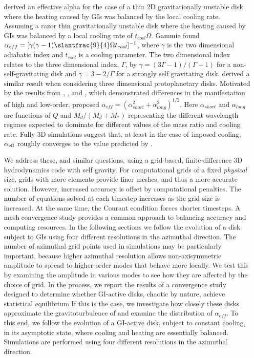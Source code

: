 \documentclass[manuscript]{aastex}
\begin{document}
\citet{gammie2001} derived an effective alpha for the case of a thin 2D gravitationally unstable disk where the heating caused by GIs was balanced by the local cooling rate.  
Assuming a razor thin gravitationally unstable disk where the heating caused by
GIs was balanced by a local cooling rate of $t_{cool}\Omega$.
Gammie found
$\alpha_{eff} = [\gamma(\gamma - 1) \slantfrac{9}{4}\Omega t_{cool}]^{-1}$,
where $\gamma$ is the two dimensional adiabatic index and $t_{cool}$ is a cooling parameter. 
The two dimensional index relates
to the three dimensional index, $\Gamma$, by 
$\gamma = (3\Gamma - 1) / (\Gamma + 1)$
for a non-self-gravitating
disk and
$\gamma = 3 - 2/\Gamma $
for a strongly self gravitating disk.   \cite{lodato2004} derived a similar result when considering three dimensional protoplanetary disks.
Motivated by
the results from \cite{laughlin1996}, \cite{gammie2001}, and \cite{lodato2004, lodato2005}, which demonstrated differences in the manifestation of high and low-order, \citet{kratter2008} 
proposed $\alpha_{eff} = (\alpha_{short}^2 + \alpha_{long}^2)^{1/2}$. Here $\alpha_{short}$ and $\alpha_{long}$
are functions of $Q$ and $M_d/\left( M_d+M_*\right)$ representing 
the different wavelength regimes expected to dominate for different values of the mass ratio and cooling rate. 
Fully 3D simulations \citep[e.g.][]{lodato2004, cossins2009} suggest that, at least in the case of imposed cooling, $\alpha_{\rm{eff}}$ roughly converges to the value predicted by \citeauthor{gammie2001}. 

We address these, and similar questions, using a grid-based, finite-difference 3D hydrodynamics code
with self gravity.
For computational grids of a fixed {\it physical} size,
grids with more elements provide finer meshes, and thus a more accurate solution. 
However, increased accuracy is offset by computational penalties.
The number of equations solved at each timestep 
increases as the grid size is increased.  At the same time, the Courant condition 
forces shorter timesteps.  A mesh convergence study 
provides a common approach to balancing accuracy and computing resources.
In the following sections we follow the evolution of a disk subject to GIs
using four different
resolutions in the azimuthal direction.  The number of azimuthal grid points used in simulations
may be particularly important, because higher azimuthal resolution 
allows non-axisymmetric amplitude to spread to higher-order modes 
that behave more locally. We test this by examining the amplitude in various 
modes to see how they are affected by the choice of grid.
In the process, 
we report the results of a convergence study designed to determine whether GI-active disks, chaotic by nature, achieve statistical equilibrium If this is the case, we investigate how closely these disks approximate the gravitoturbulence of \citet{gammie2001} and examine the distribution of $\alpha_{eff}$. To this end, we follow the evolution of a GI-active disk, subject to constant cooling, in its asymptotic state, where cooling and heating are essentially balanced.  Simulations are performed using four different resolutions in the azimuthal direction.  
\end{document}
